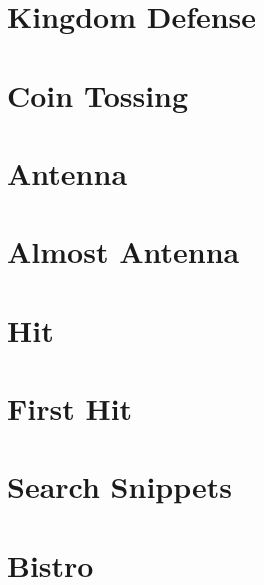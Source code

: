 \documentclass[a4paper, 10pt]{article}
\let\stdsection\section
\renewcommand\section{\newpage\stdsection}
\newcommand{\includecode}[1]{
    }
\newcommand{\algoAuthor}{2} %
\begin{document}
    \section{Kingdom Defense}
        \label{sec:kingdom_defense}
        \includecode{../problems/w05/Kingdom_Defense/KingdomDefense\algoAuthor.cpp}
    
    \section{Coin Tossing}
        \label{sec:coin_tossing}
        \includecode{../problems/w05/Coin_Tossing/CoinTossing\algoAuthor.cpp}
          

    \section{Antenna}
        \label{sec:antenna}
        \includecode{../problems/w06/Antenna/Antenna\algoAuthor.cpp}
        
    \section{Almost Antenna}
        \label{sec:almost_antenna}
        \includecode{../problems/w06/AlmostAntenna/AlmostAntenna\algoAuthor.cpp}
        
    \section{Hit}
        \label{sec:hit}
        \includecode{../problems/w06/Hit/Hit\algoAuthor.cpp}
        
    \section{First Hit}
        \label{sec:first_hit}
        \includecode{../problems/w06/FirstHit/FirstHit\algoAuthor.cpp}
    
    \section{Search Snippets}
        \label{sec:search_snippets}
        \includecode{../problems/w06/Search_Snippets/SearchSnippets\algoAuthor.cpp}
              
    
    \section{Bistro}
        \label{sec:bistro}
        \includecode{../problems/w07/Bistro/Bistro\algoAuthor.cpp}
        
\end{document}
